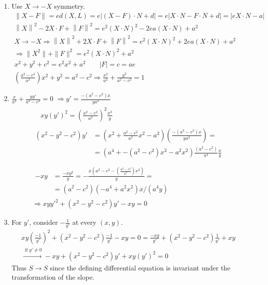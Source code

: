 \documentclass[twoside]{amsart}
\theoremstyle{plain}
\theoremstyle{definition}
\newcommand{\exercisehead}[1]
  {\smallskip
   \noindent{\small\bf Exercise #1.}}
\begin{document}
\exercisehead{20} 
\begin{enumerate}
  \item Use $X \to -X$ symmetry.  
\[
\begin{gathered}
  \| X - F \| = ed(X,L) = e| (X-F)\cdot N + d | = e |X \cdot N - F \cdot N + d | = |eX \cdot N - a | \\
  \left\| X \right\|^2 - 2X \cdot F + \left\| F \right\|^2 = e^2 (X\cdot N )^2 - 2ea (X\cdot N) + a^2 \\
  X \to -X \Longrightarrow   \left\| X \right\|^2 + 2X \cdot F + \left\| F \right\|^2 = e^2 (X\cdot N )^2 + 2ea (X\cdot N) + a^2 \\ 
  \Longrightarrow \| X^2 \| + \| F \|^2 = e^2 (X \cdot N)^2 + a^2 \\
  x^2 + y^2 + c^2 = e^2 x^2 + a^2 \quad \quad |F| = c = ae \\
  \left( \frac{a^2 - c^2}{ a^2 } \right) x^2 + y^2 = a^2 - c^2 \Longrightarrow \frac{x^2}{a^2} + \frac{y^2}{a^2-c^2} = 1 
\end{gathered}
\] 
  \item $\frac{x}{a^2} + \frac{yy'}{a^2 - c^2} = 0$  $\Longrightarrow y' = \frac{ - (a^2 - c^2) x}{ ya^2 } $  
\[
\begin{gathered}
  \begin{aligned}
    &    xy (y')^2  = \left( \frac{a^2 -c^2 }{ a^2 } \right)^2 \frac{x^3}{y} 
  \end{aligned} \\
  \begin{aligned}
    (x^2 - y^2 -c^2)y' & = \left( x^2 + \frac{a^2 - c^2}{a^2 } x^2 - a^2 \right) \left( \frac{ -(a^2 -c^2) x }{ ya^2 } \right) = \\
    & = (a^4 + -(a^2 -c^2)x^2 - a^2 x^2 ) \frac{ (a^2-c^2)}{ a^4} \frac{x}{y} \\    
  \end{aligned} \\
  \begin{aligned}
    -xy & = \frac{ -xy^2}{y} = - \frac{x (a^2-c^2 - \left( \frac{a^2 -c^2}{a^2 } \right) x^2 )}{ y } = \\
    & = (a^2-c^2) (-a^4 + a^2 x^2 )x /(a^4 y) 
\end{aligned} \\
  \Longrightarrow xy y'^2 + (x^2-y^2 - c^2) y' -xy = 0 
\end{gathered}
\]
  \item For $y'$, consider $-\frac{1}{y'}$ at every $(x,y)$.  
\[
\begin{gathered}
  xy \left( \frac{-1}{y'} \right)^2 + (x^2 - y^2 -c^2 ) \frac{-1}{y'} - xy = 0 = \frac{-xy}{y'} + (x^2 -y^2 -c^2)\frac{1}{y'} + xy \\
  \xrightarrow{ \text{ if } y' \neq 0 } -xy + (x^2 -y^2 -c^2 )y' + xy (y')^2 = 0 
\end{gathered}
\]
Thus $S\to S$ since the defining differential equation is invariant under the transformation of the slope.  
\end{enumerate}
\end{document}
